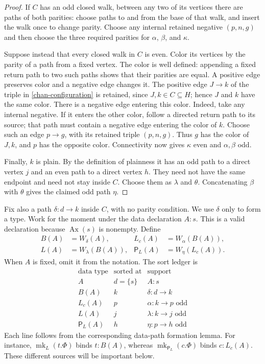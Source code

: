 \begin{proof}
If $C$ has an odd closed walk, between any two of its vertices there are
paths of both parities: choose paths to and from the base of that walk,
and insert the walk once to change parity.  Choose any internal retained
negative $(p,n,g)$ and then choose the three required parities for
$\alpha$, $\beta$, and $\kappa$.

Suppose instead that every closed walk in $C$ is even.  Color its vertices
by the parity of a path from a fixed vertex.  The color is well defined:
appending a fixed return path to two such paths shows that their parities
are equal.  A positive edge preserves color and a negative edge changes
it.  The positive edge $J\longrightarrow k$ of the triple in
\eqref{chan-configuration} is retained, since $J,k\in C\subseteq H$;
hence $J$ and $k$ have the same color.  There is a negative edge entering
this color.  Indeed, take any internal negative.  If it enters the other
color, follow a directed return path to its source; that path must contain
a negative edge entering the color of $k$.  Choose such an edge
$p\longrightarrow g$, with its retained triple $(p,n,g)$.  Thus $g$ has
the color of $J,k$, and $p$ has the opposite color.  Connectivity now gives
$\kappa$ even and $\alpha,\beta$ odd.

Finally, $k$ is plain.  By the definition of plainness it has an odd path
to a direct vertex $j$ and an even path to a direct vertex $h$.  They need
not have the same endpoint and need not stay inside $C$.  Choose them as
$\lambda$ and $\theta$.  Concatenating $\beta$ with $\theta$ gives the
claimed odd path $\eta$.
\end{proof}

Fix also a path $\delta:d\longrightarrow k$ inside $C$, with no parity
condition.  We use $\delta$ only to form a type.  Work for the moment under
the data declaration $A:s$.  This is a valid declaration because
$\operatorname{Ax}(s)$ is nonempty.  Define
\begin{equation}
\begin{aligned}
 B(A)&=W_{\delta}(A),&
 L_c(A)&=W_{\alpha}(B(A)),\\
 L(A)&=W_{\lambda}(B(A)),&
 \mathsf P_L(A)&=W_{\eta}(L_c(A)).
\end{aligned}
\label{chan-basic-types}
\end{equation}
When $A$ is fixed, omit it from the notation.  The sort ledger is
\[
\begin{array}{c|c|l}
\text{data type}&\text{sorted at}&\text{support}\\ \hline
A&d=\{s\}&A:s\\
B(A)&k&\delta:d\longrightarrow k\\
L_c(A)&p&\alpha:k\longrightarrow p\text{ odd}\\
L(A)&j&\lambda:k\longrightarrow j\text{ odd}\\
\mathsf P_L(A)&h&\eta:p\longrightarrow h\text{ odd}
\end{array}
\]
Each line follows from the corresponding data-path formation lemma.
For instance, $\operatorname{mk}_{L}(t.\Phi)$ binds $t:B(A)$, whereas
$\operatorname{mk}_{\mathsf P_L}(c.\Phi)$ binds $c:L_c(A)$.  These
different sources will be important below.

